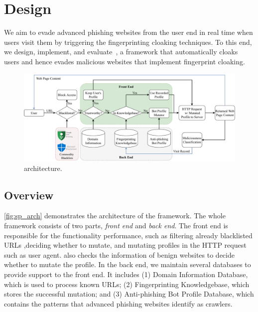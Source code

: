 \section{Design}


We aim to evade advanced phishing websites from the user end in real time when users visit them by triggering the fingerprinting cloaking techniques.
To this end, we design, implement, and evaluate~\spartacus, a framework that automatically cloaks users and hence evades malicious websites that implement fingerprint cloaking.

\begin{figure}
\centering
\includegraphics[width=\linewidth]{figs/arch.pdf}
\caption{\spartacus architecture.}
\label{fig:sp_arch}
\end{figure}

\subsection{Overview}
\autoref{fig:sp_arch} demonstrates the architecture of the \spartacus framework.
The whole framework consists of two parts, \emph{front end} and \emph{back end}. 
The front end is responsible for the functionality performance, such as filtering already blacklisted URLs ,deciding whether to mutate, and mutating profiles in the HTTP request such as user agent.
\spartacus also checks the information of benign websites to decide whether to mutate the profile.
In the back end, we maintain several databases to provide support to the front end.
It includes (1) Domain Information Database, which is used to process known URLs; 
(2) Fingerprinting Knowledgebase, which stores the successful mutation;
and (3) Anti-phishing Bot Profile Database, which contains the patterns that advanced phishing websites identify as crawlers.

